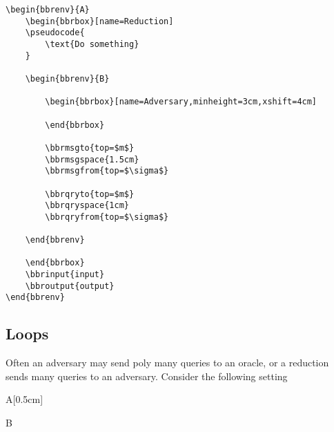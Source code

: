 \documentclass[a4paper]{report}
\begin{document}
\begin{lstlisting}
\begin{bbrenv}{A}
	\begin{bbrbox}[name=Reduction]
	\pseudocode{
		\text{Do something}
	}

	\begin{bbrenv}{B}

		\begin{bbrbox}[name=Adversary,minheight=3cm,xshift=4cm]

		\end{bbrbox}

		\bbrmsgto{top=$m$}
		\bbrmsgspace{1.5cm}
		\bbrmsgfrom{top=$\sigma$}

		\bbrqryto{top=$m$}
		\bbrqryspace{1cm}
		\bbrqryfrom{top=$\sigma$}

	\end{bbrenv}

	\end{bbrbox}
	\bbrinput{input}
	\bbroutput{output}
\end{bbrenv}
\end{lstlisting}


\subsection{Loops}
Often an adversary may send poly many queries to an oracle, or a reduction sends many queries to an adversary.
Consider the following setting

\begin{bbrenv}[1cm]{A}[0.5cm]
	\begin{bbrbox}[name=Reduction]

	\begin{bbrenv}{B}

		\begin{bbrbox}[name=Adversary,minheight=3cm,xshift=4cm]

		\end{bbrbox}


	\end{bbrenv}

	\end{bbrbox}
\end{bbrenv}
\end{document}
